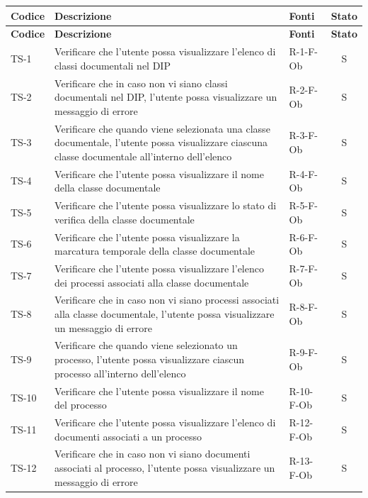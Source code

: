 \documentclass[a4paper,12pt]{article}
\begin{document}
\setlength{\LTleft}{-0.4cm}
\renewcommand{\arraystretch}{1.2}
\begin{longtable}{|p{1.5cm}|p{8.3cm}|p{2.4cm}|c|}
\hline
\rowcolor{zpusgreen!30}
\textbf{Codice} & \textbf{Descrizione} & \textbf{Fonti} & \textbf{Stato} \\
\hline
\endfirsthead
\rowcolor{zpusgreen!30}
\textbf{Codice} & \textbf{Descrizione} & \textbf{Fonti} & \textbf{Stato} \\
\hline
\endhead

TS-1 & Verificare che l'utente possa visualizzare l'elenco di classi documentali nel DIP & R-1-F-Ob & S \\
\hline
TS-2 & Verificare che in caso non vi siano classi documentali nel DIP, l'utente possa visualizzare un messaggio di errore & R-2-F-Ob & S \\
\hline
TS-3 & Verificare che quando viene selezionata una classe documentale, l'utente possa visualizzare ciascuna classe documentale all'interno dell'elenco & R-3-F-Ob & S \\
\hline
TS-4 & Verificare che l'utente possa visualizzare il nome della classe documentale & R-4-F-Ob & S \\
\hline
TS-5 & Verificare che l'utente possa visualizzare lo stato di verifica della classe documentale & R-5-F-Ob & S \\
\hline
TS-6 & Verificare che l'utente possa visualizzare la marcatura temporale della classe documentale & R-6-F-Ob & S \\
\hline
TS-7 & Verificare che l'utente possa visualizzare l'elenco dei processi associati alla classe documentale & R-7-F-Ob & S \\
\hline
TS-8 & Verificare che in caso non vi siano processi associati alla classe documentale, l'utente possa visualizzare un messaggio di errore & R-8-F-Ob & S \\
\hline
TS-9 & Verificare che quando viene selezionato un processo, l'utente possa visualizzare ciascun processo all'interno dell'elenco & R-9-F-Ob & S \\
\hline
TS-10 & Verificare che l'utente possa visualizzare il nome del processo & R-10-F-Ob & S \\
\hline
TS-11 & Verificare che l'utente possa visualizzare l'elenco di documenti associati a un processo & R-12-F-Ob & S \\
\hline
TS-12 & Verificare che in caso non vi siano documenti associati al processo, l'utente possa visualizzare un messaggio di errore & R-13-F-Ob & S \\

\end{longtable}
\end{document}
